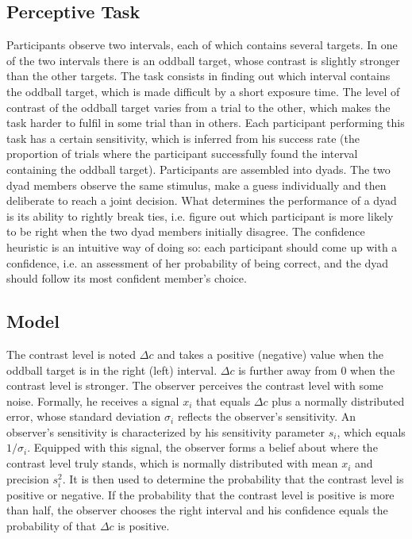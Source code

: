 \documentclass[12pt]{article}
\begin{document}
\subsection{Perceptive Task}
Participants observe two intervals, each of which contains several targets. In one of the two intervals there is an oddball target, whose contrast is slightly stronger than the other targets. The task consists in finding out which interval contains the oddball target, which is made difficult by a short exposure time. The level of contrast of the oddball target varies from a trial to the other, which makes the task harder to fulfil in some trial than in others. Each participant performing this task has a certain sensitivity, which is inferred from his success rate (the proportion of trials where the participant successfully found the interval containing the oddball target). Participants are assembled into dyads. The two dyad members observe the same stimulus, make a guess individually and then deliberate to reach a joint decision. What determines the performance of a dyad is its ability to rightly break ties, i.e. figure out which participant is more likely to be right when the two dyad members initially disagree. The confidence heuristic is an intuitive way of doing so: each participant should come up with a confidence, i.e. an assessment of her probability of being correct, and the dyad should follow its most confident member's choice.

\subsection{Model}
The contrast level is noted $\Delta c$ and takes a positive (negative) value when the oddball target is in the right (left) interval. $\Delta c$ is further away from 0 when the contrast level is stronger. The observer perceives the contrast level with some noise. Formally, he receives a signal $x_i$ that equals $\Delta c$ plus a normally distributed error, whose standard deviation $\sigma_i$ reflects the observer's sensitivity. An observer's sensitivity is characterized by his sensitivity parameter $s_i$, which equals $1/\sigma_i$. Equipped with this signal, the observer forms a belief about where the contrast level truly stands, which is normally distributed with mean $x_i$ and precision $s_i^2$. It is then used to determine the probability that the contrast level is positive or negative. If the probability that the contrast level is positive is more than half, the observer chooses the right interval and his confidence equals the probability of that $\Delta c$ is positive.
\end{document}
